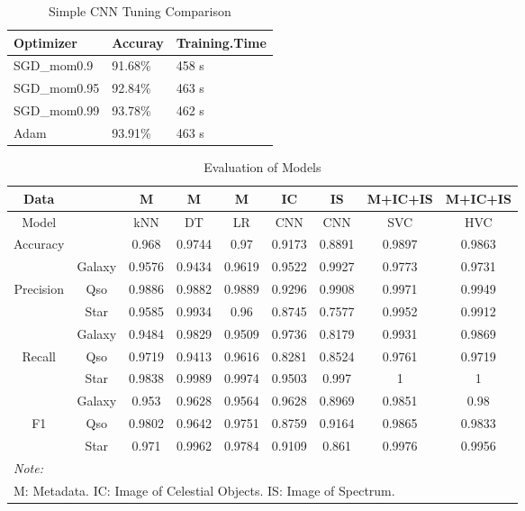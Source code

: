 \documentclass[
  11pt,
]{article}
\begin{document}
\begin{table}[H]
\centering
\caption{Simple CNN Tuning Comparison}
\label{tab:simple-cnn}
\centering
\begin{tabular}[t]{lll}
\toprule
Optimizer & Accuray & Training.Time\\
\midrule
SGD\_mom0.9 & 91.68\% & 458 s\\
SGD\_mom0.95 & 92.84\% & 463 s\\
SGD\_mom0.99 & 93.78\% & 462 s\\
Adam & 93.91\% & 463 s\\
\bottomrule
\end{tabular}
\end{table}

\begin{table}[H]
\centering
\caption{Evaluation of Models}
\label{tab:eval}
\centering
\begin{tabular}[t]{ccccccccc}
\toprule
Data &  & M & M & M & IC & IS & M+IC+IS & M+IC+IS\\
\midrule
Model &  & kNN & DT & LR & CNN & CNN & SVC & HVC\\
\midrule
Accuracy &  & 0.968 & 0.9744 & 0.97 & 0.9173 & 0.8891 & 0.9897 & 0.9863\\
\addlinespace
& Galaxy & 0.9576 & 0.9434 & 0.9619 & 0.9522 & 0.9927 & 0.9773 & 0.9731\\
Precision & Qso & 0.9886 & 0.9882 & 0.9889 & 0.9296 & 0.9908 & 0.9971 & 0.9949\\
& Star & 0.9585 & 0.9934 & 0.96 & 0.8745 & 0.7577 & 0.9952 & 0.9912\\
\addlinespace
& Galaxy & 0.9484 & 0.9829 & 0.9509 & 0.9736 & 0.8179 & 0.9931 & 0.9869\\
Recall & Qso & 0.9719 & 0.9413 & 0.9616 & 0.8281 & 0.8524 & 0.9761 & 0.9719\\
& Star & 0.9838 & 0.9989 & 0.9974 & 0.9503 & 0.997 & 1 & 1\\
\addlinespace
& Galaxy & 0.953 & 0.9628 & 0.9564 & 0.9628 & 0.8969 & 0.9851 & 0.98\\
F1 & Qso & 0.9802 & 0.9642 & 0.9751 & 0.8759 & 0.9164 & 0.9865 & 0.9833\\
& Star & 0.971 & 0.9962 & 0.9784 & 0.9109 & 0.861 & 0.9976 & 0.9956\\
\bottomrule
\multicolumn{9}{l}{\rule{0pt}{1em}\textit{Note: }}\\
\multicolumn{9}{l}{\rule{0pt}{1em}M: Metadata. IC: Image of Celestial Objects. IS: Image of Spectrum.}\\
\end{tabular}
\end{table}
\end{document}
